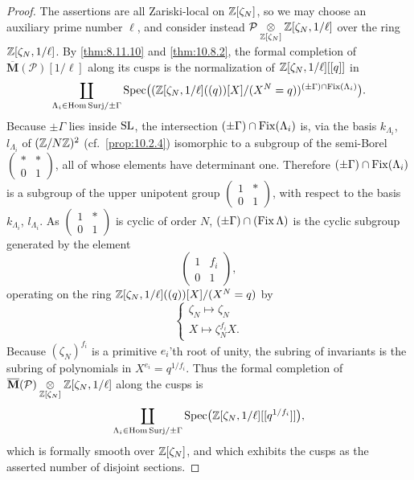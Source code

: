 \begin{proof}
The assertions are all Zariski-local on $\mathbb{Z}[\zeta_N]$, so we may choose an auxiliary prime number $\ell$, and consider instead $\mathcal{P} \underset{\mathbb{Z}[\zeta_N]}{\otimes} \mathbb{Z}[\zeta_N, 1/\ell]$ over the ring $\mathbb{Z}[\zeta_N, 1/\ell]$. By \eqref{thm:8.11.10} and \eqref{thm:10.8.2}, the formal completion of $\overline{\mathbf{M}}(\mathcal{P})[1/\ell]$ along its cusps is the normalization of $\mathbb{Z}[\zeta_N, 1/\ell][[q]]$ in
\[
\coprod_{\Lambda_i \in \mathrm{Hom\,Surj}/\pm\Gamma} \operatorname{Spec}\bigl((\mathbb{Z}[\zeta_N, 1/\ell]((q))[X]/(X^N = q))^{(\pm\Gamma)\cap\operatorname{Fix}(\Lambda_i)}\bigr) .
\]
Because $\pm\Gamma$ lies inside $\operatorname{SL}$, the intersection $(\pm\Gamma)\cap\operatorname{Fix}(\Lambda_i)$ is, via the basis $k_{\Lambda_i}$, $l_{\Lambda_i}$ of $(\mathbb{Z}/N\mathbb{Z})^2$ (cf.~\ref{prop:10.2.4}) isomorphic to a subgroup of the semi-Borel $\begin{pmatrix} * & * \\ 0 & 1 \end{pmatrix}$, all of whose elements have determinant one. Therefore $(\pm\Gamma)\cap\operatorname{Fix}(\Lambda_i)$ is a subgroup of the upper unipotent group $\begin{pmatrix} 1 & * \\ 0 & 1 \end{pmatrix}$, with respect to the basis $k_{\Lambda_i}$, $l_{\Lambda_i}$. As $\begin{pmatrix} 1 & * \\ 0 & 1 \end{pmatrix}$ is cyclic of order $N$, $(\pm\Gamma)\cap(\operatorname{Fix}\Lambda)$ is the cyclic subgroup generated by the element
\[
\begin{pmatrix} 1 & f_i \\ 0 & 1 \end{pmatrix} ,
\]
operating on the ring $\mathbb{Z}[\zeta_N, 1/\ell]((q))[X]/(X^N = q)$ by
\[
\begin{cases}
\zeta_N \mapsto \zeta_N \\
X \mapsto \zeta_N^{f_i} X .
\end{cases}
\]
Because $(\zeta_N)^{f_i}$ is a primitive $e_i$'th root of unity, the subring of invariants is the subring of polynomials in $X^{e_i} = q^{1/f_i}$. Thus the formal completion of $\overline{\mathbf{M}}(\mathcal{P}) \underset{\mathbb{Z}[\zeta_N]}{\otimes} \mathbb{Z}[\zeta_N, 1/\ell]$ along the cusps is
\[
\coprod_{\Lambda_i \in \mathrm{Hom\,Surj}/\pm\Gamma} \operatorname{Spec}\bigl(\mathbb{Z}[\zeta_N, 1/\ell][[q^{1/f_i}]]\bigr) ,
\]
which is formally smooth over $\mathbb{Z}[\zeta_N]$, and which exhibits the cusps as the asserted number of disjoint sections.
\end{proof}

